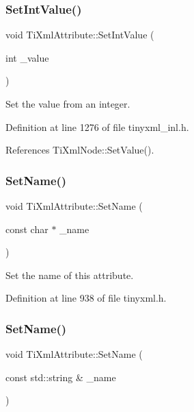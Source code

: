 \subsubsection{\texorpdfstring{Set\+Int\+Value()}{SetIntValue()}}
{\footnotesize\ttfamily void Ti\+Xml\+Attribute\+::\+Set\+Int\+Value (\begin{DoxyParamCaption}\item[{int}]{\+\_\+value }\end{DoxyParamCaption})}



Set the value from an integer. 



Definition at line 1276 of file tinyxml\+\_\+inl.\+h.



References Ti\+Xml\+Node\+::\+Set\+Value().

\hypertarget{class_ti_xml_attribute_ab7fa3d21ff8d7c5764cf9af15b667a99}{}\label{class_ti_xml_attribute_ab7fa3d21ff8d7c5764cf9af15b667a99} 
\subsubsection{\texorpdfstring{Set\+Name()}{SetName()}\hspace{0.1cm}{\footnotesize\ttfamily [1/2]}}
{\footnotesize\ttfamily void Ti\+Xml\+Attribute\+::\+Set\+Name (\begin{DoxyParamCaption}\item[{const char $\ast$}]{\+\_\+name }\end{DoxyParamCaption})\hspace{0.3cm}{\ttfamily [inline]}}



Set the name of this attribute. 



Definition at line 938 of file tinyxml.\+h.

\hypertarget{class_ti_xml_attribute_ab296ff0c9a8c701055cd257a8a976e57}{}\label{class_ti_xml_attribute_ab296ff0c9a8c701055cd257a8a976e57} 
\subsubsection{\texorpdfstring{Set\+Name()}{SetName()}\hspace{0.1cm}{\footnotesize\ttfamily [2/2]}}
{\footnotesize\ttfamily void Ti\+Xml\+Attribute\+::\+Set\+Name (\begin{DoxyParamCaption}\item[{const std\+::string \&}]{\+\_\+name }\end{DoxyParamCaption})\hspace{0.3cm}{\ttfamily [inline]}}



